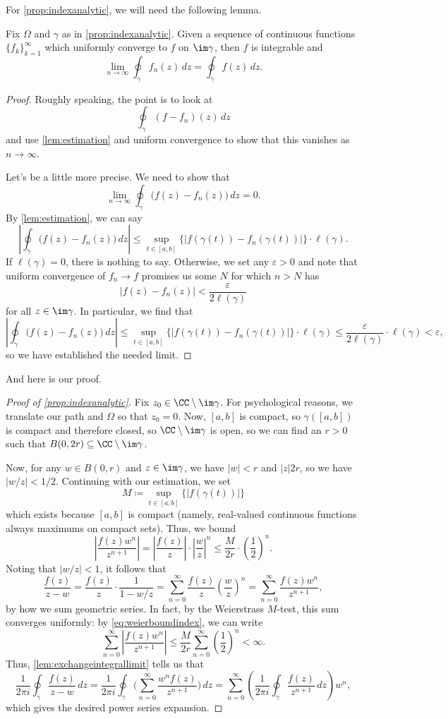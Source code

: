 For \autoref{prop:indexanalytic}, we will need the following lemma.
\begin{lemma} \label{lem:exchangeintegrallimit}
	Fix $\Omega$ and $\gamma$ as in \autoref{prop:indexanalytic}. Given a sequence of continuous functions $\{f_k\}_{k=1}^\infty$ which uniformly converge to $f$ on $\im\gamma$, then $f$ is integrable and
	\[\lim_{n\to\infty}\oint_\gamma f_n(z)\,dz=\oint_\gamma f(z)\,dz.\]
\end{lemma}
\begin{proof}
	Roughly speaking, the point is to look at
	\[\oint_\gamma(f-f_n)(z)\,dz\]
	and use \autoref{lem:estimation} and uniform convergence to show that this vanishes as $n\to\infty$.

	Let's be a little more precise. We need to show that
	\[\lim_{n\to\infty}\oint_\gamma\big(f(z)-f_n(z)\big)\,dz=0.\]
	By \autoref{lem:estimation}, we can say
	\[\left|\oint_\gamma\big(f(z)-f_n(z)\big)\,dz\right|\le\sup_{t\in[a,b]}\{|f(\gamma(t))-f_n(\gamma(t))|\}\cdot\ell(\gamma).\]
	If $\ell(\gamma)=0$, there is nothing to say. Otherwise, we set any $\varepsilon>0$ and note that uniform convergence of $f_n\to f$ promises us some $N$ for which $n>N$ has
	\[|f(z)-f_n(z)|<\frac{\varepsilon}{2\ell(\gamma)}\]
	for all $z\in\im\gamma$. In particular, we find that
	\[\left|\oint_\gamma\big(f(z)-f_n(z)\big)\,dz\right|\le\sup_{t\in[a,b]}\{|f(\gamma(t))-f_n(\gamma(t))|\}\cdot\ell(\gamma)\le\frac\varepsilon{2\ell(\gamma)}\cdot\ell(\gamma)<\varepsilon,\]
	so we have established the needed limit.
\end{proof}
And here is our proof.
\begin{proof}[Proof of \autoref{prop:indexanalytic}]
	Fix $z_0\in\CC\setminus\im\gamma$. For psychological reasons, we translate our path and $\Omega$ so that $z_0=0$. Now, $[a,b]$ is compact, so $\gamma([a,b])$ is compact and therefore closed, so $\CC\setminus\im\gamma$ is open, so we can find an $r>0$ such that $B(0,2r)\subseteq\CC\setminus\im\gamma$.

	Now, for any $w\in B(0,r)$ and $z\in\im\gamma$, we have $|w|<r$ and $|z|2r$, so we have $|w/z|<1/2$. Continuing with our estimation, we set
	\[M\coloneqq \sup_{t\in[a,b]}\{|f(\gamma(t))|\}\]
	which exists because $[a,b]$ is compact (namely, real-valued continuous functions always maximums on compact sets). Thus, we bound
	\[\left|\frac{f(z)w^n}{z^{n+1}}\right|=\left|\frac{f(z)}z\right|\cdot\left|\frac wz\right|^n\le\frac M{2r}\cdot\left(\frac12\right)^n.\tag{$*$}\label{eq:weierboundindex}\]
	Noting that $|w/z|<1$, it follows that
	\[\frac{f(z)}{z-w}=\frac{f(z)}z\cdot\frac1{1-w/z}=\sum_{n=0}^\infty\frac{f(z)}z\left(\frac wz\right)^n=\sum_{n=0}^\infty\frac{f(z)w^n}{z^{n+1}},\]
	by how we sum geometric series. In fact, by the Weierstrass $M$-test, this sum converges uniformly: by \autoref{eq:weierboundindex}, we can write
	\[\sum_{n=0}^\infty\left|\frac{f(z)w^n}{z^{n+1}}\right|\le\frac M{2r}\sum_{n=0}^\infty\left(\frac12\right)^n<\infty.\]
	Thus, \autoref{lem:exchangeintegrallimit} tells us that
	\[\frac1{2\pi i}\oint_\gamma\frac{f(z)}{z-w}\,dz=\frac1{2\pi i}\oint_\gamma\Bigg(\sum_{n=0}^\infty\frac{w^nf(z)}{z^{n+1}}\Bigg)\,dz=\sum_{n=0}^\infty\left(\frac1{2\pi i}\oint_\gamma\frac{f(z)}{z^{n+1}}\,dz\right)w^n,\]
	which gives the desired power series expansion.
\end{proof}